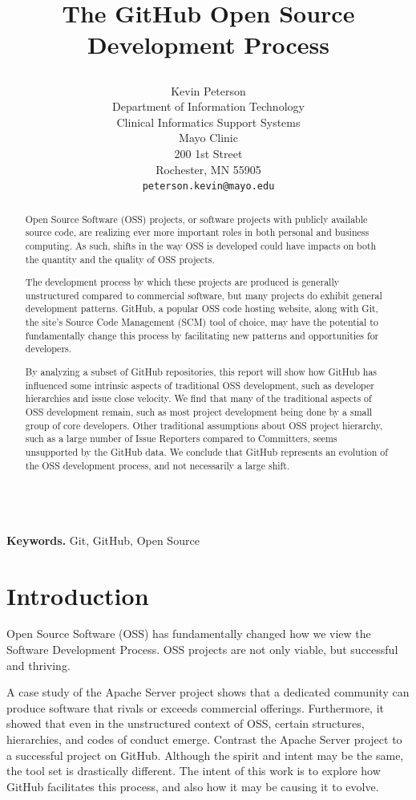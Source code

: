 \documentclass{proc}
\title{
The GitHub Open Source Development Process
\author{Kevin Peterson\\
Department of Information Technology\\
Clinical Informatics Support Systems\\
Mayo Clinic\\
200 1st Street\\
Rochester, MN  55905\\
\small \texttt{peterson.kevin@mayo.edu}
}
}
\begin{document}
\maketitle

\begin{abstract}
Open Source Software (OSS) projects, or software projects with publicly available source code, are realizing ever more important roles in both personal and business computing. As such, shifts in the way OSS is developed could have impacts on both the quantity and the quality of OSS projects.

The development process by which these projects are produced is generally unstructured compared to commercial software, but many projects do exhibit general development patterns. GitHub, a popular OSS code hosting website, along with Git, the site's Source Code Management (SCM) tool of choice, may have the potential to fundamentally change this process by facilitating new patterns and opportunities for developers.

By analyzing a subset of GitHub repositories, this report will show how GitHub has influenced some intrinsic aspects of traditional OSS development, such as developer hierarchies and issue close velocity. We find that many of the traditional aspects of OSS development remain, such as most project development being done by a small group of core developers. Other traditional assumptions about OSS project hierarchy, such as a large number of Issue Reporters compared to Committers, seems unsupported by the GitHub data. We conclude that GitHub represents an evolution of the OSS development process, and not necessarily a large shift.
\end{abstract}

\noindent \\\textbf{Keywords.} Git, GitHub, Open Source

\section{Introduction}
Open Source Software (OSS) has fundamentally changed how we view the Software Development Process\cite{raymond1999cathedral}. OSS projects are not only viable, but successful and thriving. 

A case study of the Apache Server project\cite{mockus2000case} shows that a dedicated community can produce software that rivals or exceeds commercial offerings. Furthermore, it showed that even in the unstructured context of OSS, certain structures, hierarchies, and codes of conduct emerge. Contrast the Apache Server project to a successful project on GitHub. Although the spirit and intent may be the same, the tool set is drastically different. The intent of this work is to explore how GitHub facilitates this process, and also how it may be causing it to evolve.
\end{document}
